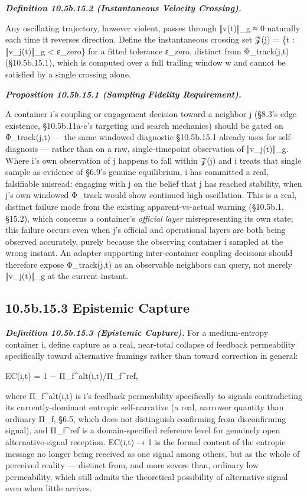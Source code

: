 \documentclass[
]{article}
\begin{document}
\emph{\textbf{Definition 10.5b.15.2 (Instantaneous Velocity Crossing).}}

Any oscillating trajectory, however violent, passes through ‖v(t)‖\_g ≈
0 naturally each time it reverses direction. Define the instantaneous
crossing set 𝒵(j) = \{t : ‖v\_j(t)‖\_g \textless{} ε\_zero\} for a
fitted tolerance ε\_zero, distinct from Φ\_track(j,t) (§10.5b.15.1),
which is computed over a full trailing window w and cannot be satisfied
by a single crossing alone.

\emph{\textbf{Proposition 10.5b.15.1 (Sampling Fidelity Requirement).}}

A container i's coupling or engagement decision toward a neighbor j
(§8.3's edge existence, §10.5b.11a-c's targeting and search mechanics)
should be gated on Φ\_track(j,t) --- the same windowed diagnostic
§10.5b.15.1 already uses for self-diagnosis --- rather than on a raw,
single-timepoint observation of ‖v\_j(t)‖\_g. Where i's own observation
of j happens to fall within 𝒵(j) and i treats that single sample as
evidence of §6.9's genuine equilibrium, i has committed a real,
falsifiable misread: engaging with j on the belief that j has reached
stability, when j's own windowed Φ\_track would show continued high
oscillation. This is a real, distinct failure mode from the existing
apparent-vs-actual warning (§10.5b.1, §15.2), which concerns a
container's \emph{official layer} misrepresenting its own state; this
failure occurs even when j's official and operational layers are both
being observed accurately, purely because the observing container i
sampled at the wrong instant. An adapter supporting inter-container
coupling decisions should therefore expose Φ\_track(j,t) as an
observable neighbors can query, not merely ‖v\_j(t)‖\_g at the current
instant.

\hypertarget{b.15.3-epistemic-capture}{%
\subsection{10.5b.15.3 Epistemic
Capture}\label{b.15.3-epistemic-capture}}

\emph{\textbf{Definition 10.5b.15.3 (Epistemic Capture).}} For a
medium-entropy container i, define capture as a real, near-total
collapse of feedback permeability specifically toward alternative
framings rather than toward correction in general:

EC(i,t) = 1 − Π\_f\^{}alt(i,t)/Π\_f\^{}ref,

where Π\_f\^{}alt(i,t) is i's feedback permeability specifically to
signals contradicting its currently-dominant entropic self-narrative (a
real, narrower quantity than ordinary Π\_f, §6.5, which does not
distinguish confirming from disconfirming signal), and Π\_f\^{}ref is a
domain-specified reference level for genuinely open alternative-signal
reception. EC(i,t) → 1 is the formal content of the entropic message no
longer being received as one signal among others, but as the whole of
perceived reality --- distinct from, and more severe than, ordinary low
permeability, which still admits the theoretical possibility of
alternative signal even when little arrives.
\end{document}
